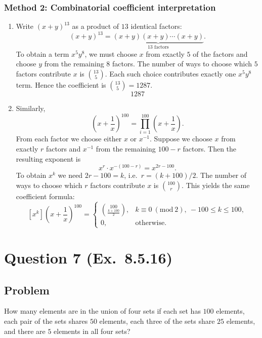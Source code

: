 \documentclass[12pt]{article}
\begin{document}
\subsubsection{Method 2: Combinatorial coefficient interpretation}
\begin{enumerate}[label=(\alph*)]
\item Write $(x+y)^{13}$ as a product of $13$ identical factors:
\[
(x+y)^{13}=\underbrace{(x+y)(x+y)\cdots(x+y)}_{13\text{ factors}}.
\]
To obtain a term $x^{5}y^{8}$, we must choose $x$ from exactly $5$ of the factors and choose $y$ from the remaining $8$ factors. The number of ways to choose which $5$ factors contribute $x$ is $\binom{13}{5}$. Each such choice contributes exactly one $x^{5}y^{8}$ term. Hence the coefficient is $\binom{13}{5}=1287$.
\[
\boxed{1287}
\]

\item Similarly,
\[
\left(x+\frac{1}{x}\right)^{100}=\prod_{i=1}^{100}\left(x+\frac{1}{x}\right).
\]
From each factor we choose either $x$ or $x^{-1}$. Suppose we choose $x$ from exactly $r$ factors and $x^{-1}$ from the remaining $100-r$ factors. Then the resulting exponent is
\[
x^{r}\cdot x^{-(100-r)}=x^{2r-100}.
\]
To obtain $x^{k}$ we need $2r-100=k$, i.e.\ $r=(k+100)/2$. The number of ways to choose which $r$ factors contribute $x$ is $\binom{100}{r}$. This yields the same coefficient formula:
\[
\boxed{
[x^k]\left(x+\frac{1}{x}\right)^{100}
=
\begin{cases}
\displaystyle \binom{100}{\frac{k+100}{2}}, & k\equiv 0\ (\mathrm{mod}\ 2),\ -100\le k\le 100,\\
0, & \text{otherwise.}
\end{cases}}
\]
\end{enumerate}

\newpage

\section{Question 7 (Ex.\ 8.5.16)}
\subsection{Problem}
How many elements are in the union of four sets if each set has $100$ elements, each pair of the sets shares $50$ elements, each three of the sets share $25$ elements, and there are $5$ elements in all four sets?
\end{document}
